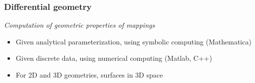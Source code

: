 \documentclass[first,firstsupp,lastsupp,handout,last,hyperref,table]{ETHclass}
\begin{document}
\begin{frame}[t]
\frametitle{Differential geometry}
\vspace{-0.5cm}
\centering
\textit{\footnotesize Computation of geometric properties of mappings}
 \begin{figure}[!h]
  \captionsetup[subfigure]{labelformat=empty}
   \centering
    \qquad
  \end{figure}
\vspace{-0.25cm}
  \begin{itemize}
  \item {\scriptsize Given analytical parameterization, using symbolic computing (Mathematica)}
  \item {\scriptsize Given discrete data, using numerical computing (Matlab, C++)}
  \item {\scriptsize For 2D and 3D geometries, surfaces in 3D space}
  \end{itemize}
\end{frame}
\end{document}

